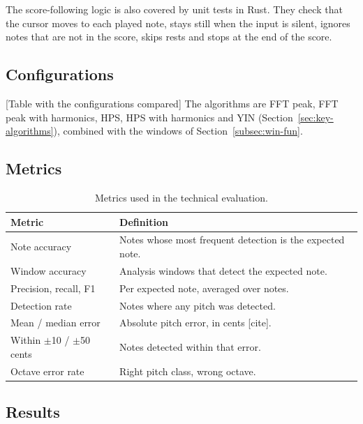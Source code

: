 The score-following logic is also covered by unit tests in Rust. They check that the 
cursor moves to each played note, stays still when the input is silent, ignores notes 
that are not in the score, skips rests and stops at the end of the score.

\subsection{Configurations}


[Table with the configurations compared] The algorithms are FFT peak, FFT peak 
with harmonics, HPS, HPS with harmonics and YIN 
(Section~\ref{sec:key-algorithms}), combined with the windows of Section~\ref{subsec:win-fun}.


\subsection{Metrics}

\begin{table}[H]
	\centering
	\begin{tabularx}{\textwidth}{l Y}
		\toprule
		\textbf{Metric}					& \textbf{Definition} \\
		\midrule
		Note accuracy					& Notes whose most frequent detection is the expected note. \\
		Window accuracy					& Analysis windows that detect the expected note. \\
		Precision, recall, F1			& Per expected note, averaged over notes. \\
		Detection rate					& Notes where any pitch was detected. \\
		Mean / median error 			& Absolute pitch error, in cents [cite]. \\
		Within $\pm$10 / $\pm$50 cents 	& Notes detected within that error. \\
		Octave error rate				& Right pitch class, wrong octave. \\
		\bottomrule
	\end{tabularx}
	\caption{Metrics used in the technical evaluation.}
	\label{tab:metrics}
\end{table}


\subsection{Results}

